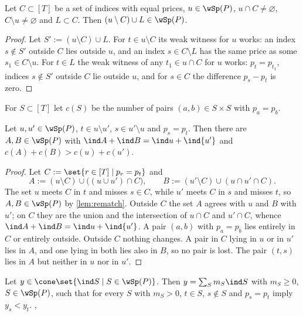 \begin{lemma}[rematching]\label{lem:rematch}
Let $C\subset[T]$ be a set of indices with equal prices, $u\in\wSp(P)$, $u\cap C\ne\varnothing$, $C\setminus u\ne\varnothing$ and $L\subset C$. Then $(u\setminus C)\cup L\in\wSp(P)$. \hfill{}
\end{lemma}

\begin{proof}
Let $S':=(u\setminus C)\cup L$. For $t\in u\setminus C$ its weak witness for $u$ works: an index $s\notin S'$ outside $C$ lies outside $u$, and an index $s\in C\setminus L$ has the same price as some $s_1\in C\setminus u$. For $t\in L$ the weak witness of any $t_1\in u\cap C$ for $u$ works: $p_t=p_{t_1}$, indices $s\notin S'$ outside $C$ lie outside $u$, and for $s\in C$ the difference $p_s-p_t$ is zero.
\end{proof}

For $S\subset[T]$ let $c(S)$ be the number of pairs $(a,b)\in S\times S$ with $p_a=p_b$.

\begin{lemma}[uncrossing]\label{lem:uncross}
Let $u,u'\in\wSp(P)$, $t\in u\setminus u'$, $s\in u'\setminus u$ and $p_s=p_t$. Then there are $A,B\in\wSp(P)$ with $\ind A+\ind B=\ind u+\ind{u'}$ and $c(A)+c(B)>c(u)+c(u')$. \hfill{}
\end{lemma}

\begin{proof}
Let $C:=\set{r\in[T]\mid p_r=p_t}$ and
\[
A:=(u\setminus C)\cup\bigl((u\cup u')\cap C\bigr),\qquad B:=(u'\setminus C)\cup(u\cap u'\cap C).
\]
The set $u$ meets $C$ in $t$ and misses $s\in C$, while $u'$ meets $C$ in $s$ and misses $t$, so $A,B\in\wSp(P)$ by \cref{lem:rematch}. Outside $C$ the set $A$ agrees with $u$ and $B$ with $u'$; on $C$ they are the union and the intersection of $u\cap C$ and $u'\cap C$, whence $\ind A+\ind B=\ind u+\ind{u'}$. A pair $(a,b)$ with $p_a=p_b$ lies entirely in $C$ or entirely outside. Outside $C$ nothing changes. A pair in $C$ lying in $u$ or in $u'$ lies in $A$, and one lying in both lies also in $B$, so no pair is lost. The pair $(t,s)$ lies in $A$ but neither in $u$ nor in $u'$.
\end{proof}

\begin{lemma}\label{lem:monotone}
Let $y\in\cone\set{\ind S\mid S\in\wSp(P)}$. Then $y=\sum_Sm_S\ind S$ with $m_S\ge0$, $S\in\wSp(P)$, such that for every $S$ with $m_S>0$, $t\in S$, $s\notin S$ and $p_s=p_t$ imply $y_s<y_t$. \hfill{}, 
\end{lemma}

